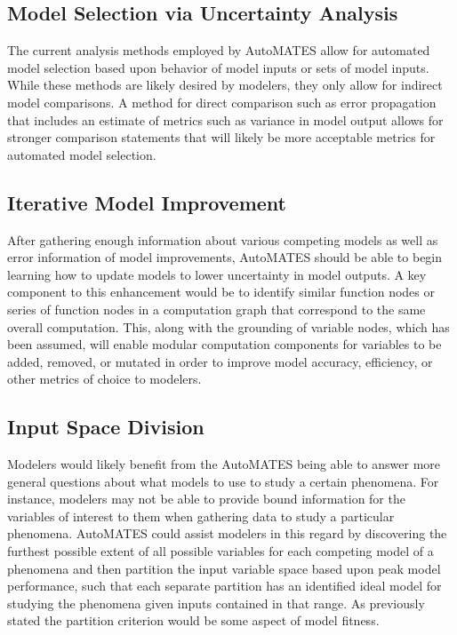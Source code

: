 \subsection{Model Selection via Uncertainty Analysis \label{auto_uncert_analysis}}
The current analysis methods employed by AutoMATES allow for automated model selection based upon behavior of model inputs or sets of model inputs. While these methods are likely desired by modelers, they only allow for indirect model comparisons. A method for direct comparison such as error propagation that includes an estimate of metrics such as variance in model output allows for stronger comparison statements that will likely be more acceptable metrics for automated model selection.

\subsection{Iterative Model Improvement\label{sec:auto_improve}}
After gathering enough information about various competing models as well as error information of model improvements, AutoMATES should be able to begin learning how to update models to lower uncertainty in model outputs.
A key component to this enhancement would be to identify similar function nodes or series of function nodes in a computation graph that correspond to the same overall computation. This, along with the grounding of variable nodes, which has been assumed, will enable modular computation components for variables to be added, removed, or mutated in order to improve model accuracy, efficiency, or other metrics of choice to modelers.

\subsection{Input Space Division\label{sec:auto_isd}}
Modelers would likely benefit from the AutoMATES being able to answer more general questions about what models to use to study a certain phenomena. For instance, modelers may not be able to provide bound information for the variables of interest to them when gathering data to study a particular phenomena. AutoMATES could assist modelers in this regard by discovering the furthest possible extent of all possible variables for each competing model of a phenomena and then partition the input variable space based upon peak model performance, such that each separate partition has an identified ideal model for studying the phenomena given inputs contained in that range. As previously stated the partition criterion would be some aspect of model fitness.

